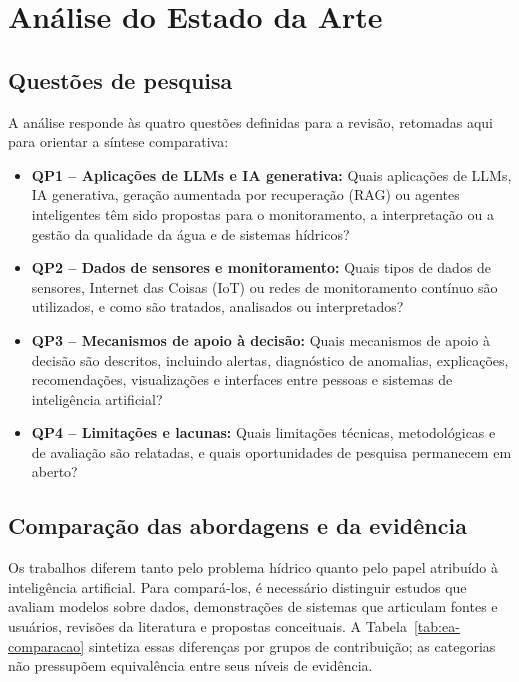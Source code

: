 \chapter{Análise do Estado da Arte}
\label{cap:estado-da-arte}

\section{Questões de pesquisa}
\label{sec:ea-questoes-pesquisa}

A análise responde às quatro questões definidas para a revisão, retomadas aqui para orientar a síntese comparativa:
\begin{itemize}
    \item \textbf{QP1 -- Aplicações de LLMs e IA generativa:} Quais aplicações de LLMs, IA generativa, geração aumentada por recuperação (RAG) ou agentes inteligentes têm sido propostas para o monitoramento, a interpretação ou a gestão da qualidade da água e de sistemas hídricos?
    \item \textbf{QP2 -- Dados de sensores e monitoramento:} Quais tipos de dados de sensores, Internet das Coisas (IoT) ou redes de monitoramento contínuo são utilizados, e como são tratados, analisados ou interpretados?
    \item \textbf{QP3 -- Mecanismos de apoio à decisão:} Quais mecanismos de apoio à decisão são descritos, incluindo alertas, diagnóstico de anomalias, explicações, recomendações, visualizações e interfaces entre pessoas e sistemas de inteligência artificial?
    \item \textbf{QP4 -- Limitações e lacunas:} Quais limitações técnicas, metodológicas e de avaliação são relatadas, e quais oportunidades de pesquisa permanecem em aberto?
\end{itemize}

\section{Comparação das abordagens e da evidência}
\label{sec:ea-comparacao}

Os trabalhos diferem tanto pelo problema hídrico quanto pelo papel atribuído à inteligência artificial. Para compará-los, é necessário distinguir estudos que avaliam modelos sobre dados, demonstrações de sistemas que articulam fontes e usuários, revisões da literatura e propostas conceituais. A Tabela~\ref{tab:ea-comparacao} sintetiza essas diferenças por grupos de contribuição; as categorias não pressupõem equivalência entre seus níveis de evidência.

